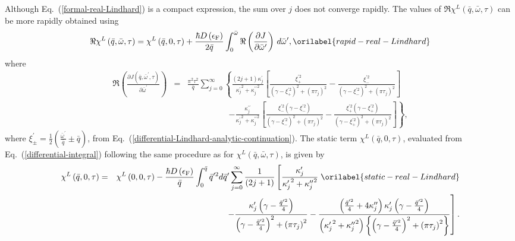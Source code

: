 \documentclass[aps,showkeys,noshowpacs,superscriptaddress,pre,preprint]{revtex4-2}
\let\label\orilabel
\begin{document}
Although Eq.~(\ref{formal-real-Lindhard}) is a compact expression,
the sum over $j$ does not converge rapidly.
The values of $\Re \chi^L \left( \bar{q}, \bar{\omega}, \tau \right)$ can be more rapidly obtained using
\begin{equation}
\Re \chi^L \left( \bar{q} , \bar{\omega}, \tau \right) =
\chi^L \left( \bar{q} , 0, \tau \right)
+ \frac{\hbar D\left( \epsilon_\mathrm{F} \right)}{2 \bar{q} }
\int_0^{\bar{\omega}} \Re \left( \frac{\partial J}{\partial \bar{\omega}^\prime } \right) \, d\bar{\omega}^\prime ,
\label{rapid-real-Lindhard}
\end{equation}
where
\begin{eqnarray*}
 \Re \left( \frac{\partial J \left( \bar{q}, \bar{\omega}^\prime, \tau \right)}{\partial \bar{\omega}^\prime} \right) 
&=& \frac{\pi^2 \tau^2}{\bar{q}} 
 \sum_{j = 0}^{\infty} \left\{
\frac{\left( 2j + 1 \right) \kappa_j^\prime}{{\kappa_j^\prime}^2 + {\kappa_j^{\prime\prime}}^2 }
\left[
\frac{\xi_+^{\prime 2}}{\left( \gamma - \xi_+^{\prime 2} \right)^2 + \left( \pi \tau_j \right)^2}
- \frac{\xi_-^{\prime 2}}{\left( \gamma - \xi_-^{\prime 2} \right)^2 + \left( \pi \tau_j \right)^2}
\right]
\right.
\nonumber \\
& & \qquad \qquad  \quad \left. 
- \frac{\kappa_j^{\prime\prime}}{{\kappa_j^\prime}^2 + {\kappa_j^{\prime\prime}}^2 }
\left[
\frac{\xi_-^{\prime 2} \left( \gamma - \xi_-^{\prime 2} \right)}{\left( \gamma - \xi_-^{\prime 2} \right)^2 + \left( \pi \tau_j \right)^2}
- \frac{\xi_+^{\prime 2} \left( \gamma - \xi_+^{\prime 2} \right)}{\left( \gamma - \xi_+^{\prime 2} \right)^2 + \left( \pi \tau_j \right)^2}
\right]
\right\} ,
\nonumber
\end{eqnarray*}
where $\xi_{\pm}^{\prime} = \frac{1}{2} \left( \frac{\bar{\omega}^{\prime}}{\bar{q}} \pm \bar{q} \right)$,
from Eq.~(\ref{differential-Lindhard-analytic-continuation}).
The static term $\chi^L \left( \bar{q} , 0, \tau \right)$, evaluated from Eq.~(\ref{differential-integral}) following
the same procedure as for $\chi^L \left( \bar{q} , \bar{\omega}, \tau \right)$, is given by
\begin{eqnarray}
\chi^L \left( \bar{q} , 0, \tau \right) &=&
\chi^L \left( 0 , 0, \tau \right) 
 - \frac{\hbar D\left( \epsilon_\mathrm{F} \right) }{\bar{q}} 
\int_0^{\bar{q}} \bar{q}^{\prime 2} d{\bar{q}^\prime}
\sum_{j = 0}^{\infty} \frac{1}{\left( 2j + 1 \right)}
\left[
\frac{\kappa_j^\prime}{{\kappa_j^\prime}^2 + {\kappa_j^{\prime\prime}}^2} 
\right.
\label{static-real-Lindhard}
 \\
& &
\left.
- \frac{\kappa_j^\prime \left( \gamma - \frac{\bar{q}^{\prime 2}}{4} \right)}{
\left( \gamma - \frac{\bar{q}^{\prime 2}}{4} \right)^2 + \left( \pi \tau_j \right)^2 }
- \frac{ \left( \frac{\bar{q}^{\prime 2}}{4} + 4 \kappa_j^{\prime\prime} \right) \kappa_j^\prime
\left( \gamma - \frac{\bar{q}^{\prime 2}}{4} \right)
}{
\left( {\kappa_j^\prime}^2 + {\kappa_j^{\prime\prime}}^2 \right)
\left\{
\left( \gamma - \frac{\bar{q}^{\prime 2}}{4} \right)^2 
+ \left( \pi \tau_j \right)^2
\right\}
}
\right]  .
\nonumber
\end{eqnarray}
\end{document}
